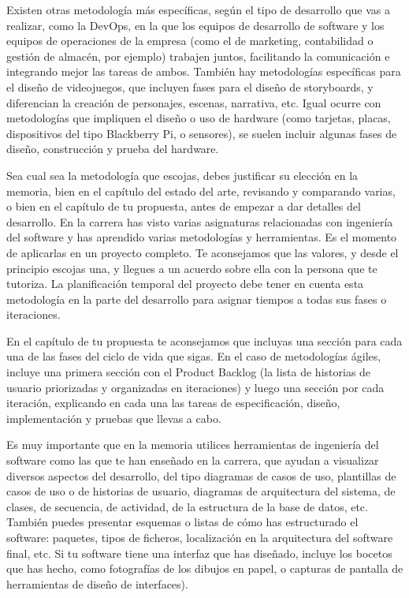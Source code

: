 Existen otras metodología más específicas, según el tipo de desarrollo que vas a realizar, como la DevOps, en la que los  equipos de desarrollo  de software y los equipos de operaciones de la empresa (como el de marketing, contabilidad o gestión de almacén, por ejemplo) trabajen juntos, facilitando la comunicación e integrando mejor las tareas de ambos. También hay metodologías específicas para el diseño de videojuegos, que incluyen fases para el diseño de storyboards, y diferencian la creación de personajes, escenas, narrativa, etc. Igual ocurre con metodologías que impliquen el diseño o uso de hardware (como tarjetas, placas, dispositivos del tipo Blackberry Pi, o sensores), se suelen incluir algunas fases de diseño, construcción y prueba del hardware. 

Sea cual sea la metodología que escojas, debes justificar su elección en la memoria, bien en el capítulo del estado del arte,  revisando y comparando varias, o bien en el capítulo de tu propuesta, antes de empezar a dar detalles del desarrollo. En la carrera has visto varias asignaturas relacionadas con ingeniería del software y has aprendido varias metodologías y herramientas. Es el momento de aplicarlas en un proyecto completo. Te aconsejamos que las valores, y desde el principio escojas una, y llegues a un acuerdo sobre ella con la persona que te tutoriza. La planificación temporal del proyecto debe tener en cuenta esta metodología en la parte del desarrollo para asignar tiempos a todas sus fases o iteraciones. 

En el capítulo de tu propuesta te aconsejamos que incluyas una sección para cada una de las fases del ciclo de vida que sigas. En el caso de metodologías ágiles, incluye una primera sección con el Product Backlog (la lista de historias de usuario priorizadas y organizadas en iteraciones) y luego una sección por cada iteración, explicando en cada una las tareas de especificación, diseño, implementación y pruebas que llevas a cabo.

Es muy importante que en la memoria utilices herramientas de ingeniería del software como las que te han enseñado en la carrera, que ayudan a visualizar diversos aspectos del desarrollo, del tipo diagramas de casos de uso, plantillas de casos de uso o de historias de usuario, diagramas de arquitectura del sistema, de clases, de secuencia, de actividad, de la estructura de la base de datos, etc. También puedes presentar esquemas o listas de cómo has estructurado el software: paquetes, tipos de ficheros, localización en la arquitectura del software final, etc. Si tu software tiene una interfaz que has diseñado, incluye los bocetos que has hecho, como fotografías de los dibujos en papel, o capturas de pantalla de herramientas de diseño de interfaces). 

